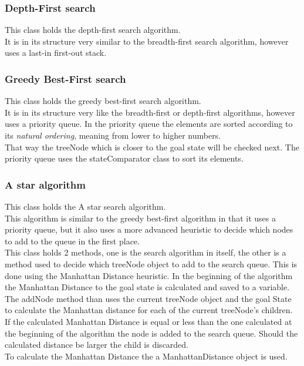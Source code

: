 \documentclass[journal]{IEEEtran}
\begin{document}
\subsubsection{Depth-First search}
This class holds the depth-first search algorithm. \\
It is in its structure very similar to the breadth-first search algorithm, however uses a last-in first-out stack. \\

\subsubsection{Greedy Best-First search}
This class holds the greedy best-first search algorithm.\\
It is in its structure very like the breadth-first or depth-first algorithms, however uses a priority queue. In the priority queue the elements are sorted according to its \textit{natural ordering}, meaning from lower to higher numbers. \\
That way the treeNode which is closer to the goal state will be checked next. 
The priority queue uses the stateComparator class to sort its elements.\\

\subsubsection{A star algorithm}
This class holds the A star search algorithm.\\
This algorithm is similar to the greedy best-first algorithm in that it uses a priority queue, but it also uses a more advanced heuristic to decide which nodes to add to the queue in the first place. \\
This class holds 2 methods, one is the search algorithm in itself, the other is a method used to decide which treeNode object to add to the search queue. This is done using the Manhattan Distance heuristic. In the beginning of the algorithm the Manhattan Distance to the goal state is calculated and saved to a variable. \\
The addNode method than uses the current treeNode object and the goal State to calculate the Manhattan distance for each of the current treeNode's children. If the calculated Manhattan Distance is equal or less than the one calculated at the beginning of the algorithm the node is added to the search queue. Should the calculated distance be larger the child is discarded. \\
To calculate the Manhattan Distance the a ManhattanDistance object is used. \\
\end{document}
